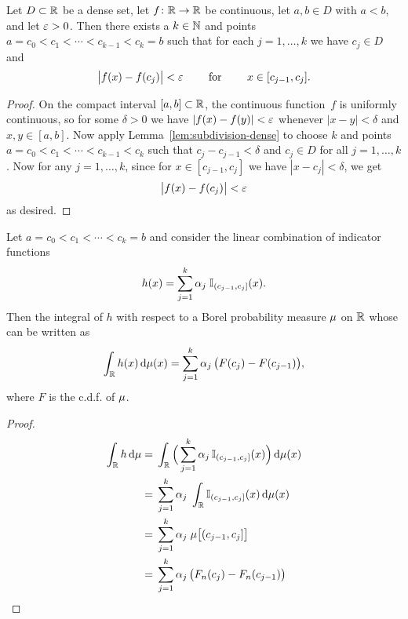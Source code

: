 \begin{lemma}
  \label{lem:continuous-function-approximation-subdivision}
  Let $D \subset \mathbb{R}$ be a dense set, let $f \colon \mathbb{R} \to \mathbb{R}$ be continuous,
  let $a, b \in D$ with $a < b$, and let $\varepsilon > 0$.
  Then there exists a $k \in \mathbb{N}$ and points
  $a=c_0 < c_1 < \cdots < c_{k-1} < c_k = b$ such that for
  each $j = 1, \ldots, k$ we have $c_j \in D$ and
  \begin{align*}
  \big| f(x) - f(c_j) \big| < \varepsilon
  \qquad \text{ for } \qquad x \in [c_{j-1} , c_j] .
  \end{align*}
\end{lemma}
\begin{proof}
  On the compact interval
  $[a,b] \subset \mathbb{R}$, the continuous function~$f$ is uniformly continuous, so for some
  $\delta > 0 $ we have $|f(x)-f(y)|<\varepsilon$ whenever $|x-y|<\delta$ and $x,y \in
  [a,b]$.
  Now apply Lemma~\ref{lem:subdivision-dense} to choose $k$ and points
  $a=c_0 < c_1 < \cdots < c_{k-1} < c_k$ such that $c_j - c_{j-1} < \delta$
  and $c_j \in D$ for all $j = 1 , \ldots , k$.
  Now for any $j = 1 , \ldots , k$, since for $x \in [c_{j-1} , c_j]$ we have
  $|x - c_j| < \delta$, we get
  \begin{align*}
  \big| f(x) - f(c_j) \big| < \varepsilon
  \end{align*}
  as desired.
\end{proof}

\begin{lemma}
  \label{lem:simple-integral-cdf-difference}
  Let $a = c_0 < c_1 < \cdots < c_k = b$ and consider the
  linear combination of indicator functions
  \begin{align*}
    h(x) = \sum_{j=1}^k \alpha_j \; \mathbb{I}_{{(c_{j-1},c_j]}}(x) .
  \end{align*}
  Then the integral of $h$ with respect to a Borel probability measure $\mu$ on $\mathbb{R}$ whose
  can be written as
  \begin{align*}
    \int_{\mathbb{R}} h(x) \, \mathrm{d} \mu (x) = \sum_{j=1}^k \alpha_j \, \big( F(c_j) - F(c_{j-1}) \big) ,
  \end{align*}
  where $F$ is the c.d.f. of $\mu$.
\end{lemma}
\begin{proof}
  \begin{align*}
  \int_{\mathbb{R}} h \, \mathrm{d} \mu
   = \; & \int_{\mathbb{R}}
          \Big( \sum_{j=1}^k \alpha_j \, \mathbb{I}_{{(c_{j-1},c_j]}}(x) \Big) \, \mathrm{d} \mu(x) \\
   = \; & \sum_{j=1}^k \alpha_j \; \int_{\mathbb{R}} \mathbb{I}_{{(c_{j-1},c_j]}}(x) \, \mathrm{d} \mu(x) \\
   = \; & \sum_{j=1}^k \alpha_j \; \mu \big[ (c_{j-1},c_j] \big] \\
   = \; & \sum_{j=1}^k \alpha_j \, \big( F_n(c_j) - F_n(c_{j-1}) \big)
  \end{align*}
\end{proof}

